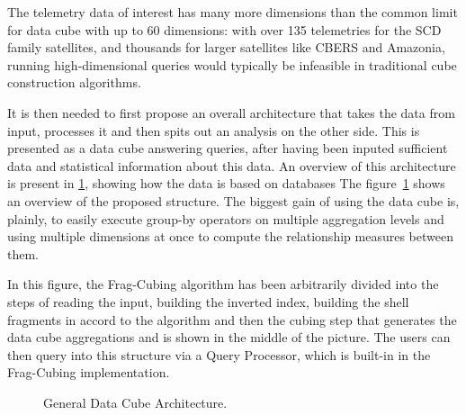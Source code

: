 The telemetry data of interest has many more dimensions than the common limit for data cube with up to 60 dimensions: with over 135 telemetries for the SCD family satellites, and thousands for larger satellites like CBERS and Amazonia, running high-dimensional queries would typically be infeasible in traditional cube construction algorithms.

It is then needed to first propose an overall architecture that takes the data from input, processes it and then spits out an analysis on the other side.
This is presented as a data cube answering queries, after having been inputed sufficient data and statistical information about this data.
An overview of this architecture is present in \ref{fig:architecture_static}, showing how the data is based on databases
The figure~\ref{fig:architecture_static} shows an overview of the proposed structure.
The biggest gain of using the data cube is, plainly, to easily execute group-by operators on multiple aggregation levels and using multiple dimensions at once to compute the relationship measures between them.

In this figure, the Frag-Cubing algorithm has been arbitrarily divided into the steps of reading the input, building the inverted index, building the shell fragments in accord to the algorithm and then the cubing step that generates the data cube aggregations and is shown in the middle of the picture.
The users can then query into this structure via a Query Processor, which is built-in in the Frag-Cubing implementation.

\begin{figure}[!htb]
  \caption{General Data Cube Architecture.}\label{fig:architecture_static}
  \vspace{2mm}
  \begin{center}
  \end{center}
  \vspace{1mm}
\end{figure}


